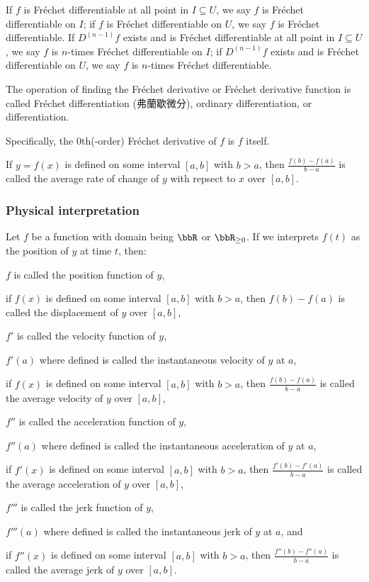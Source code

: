 If $f$ is Fréchet differentiable at all point in $I\subseteq U$, we say $f$ is Fréchet differentiable on $I$; if $f$ is Fréchet differentiable on $U$, we say $f$ is Fréchet differentiable. If $D^{(n-1)}f$ exists and is Fréchet differentiable at all point in $I\subseteq U$, we say $f$ is $n$-times Fréchet differentiable on $I$; if $D^{(n-1)}f$ exists and is Fréchet differentiable on $U$, we say $f$ is $n$-times Fréchet differentiable.

The operation of finding the Fréchet derivative or Fréchet derivative function is called Fréchet differentiation (弗蘭歇微分), ordinary differentiation, or differentiation.

Specifically, the $0$th(-order) Fréchet derivative of $f$ is $f$ itself.

If $y=f(x)$ is defined on some interval $[a,b]$ with $b>a$, then $\frac{f(b)-f(a)}{b-a}$ is called the average rate of change of $y$ with repsect to $x$ over $[a,b]$.
\subsubsection{Physical interpretation}
Let $f$ be a function with domain being $\bbR$ or $\bbR_{\geq 0}$. If we interprets $f(t)$ as the position of $y$ at time $t$, then:
\bit
\item $f$ is called the position function of $y$,
\item if $f(x)$ is defined on some interval $[a,b]$ with $b>a$, then $f(b)-f(a)$ is called the displacement of $y$ over $[a,b]$,
\item $f'$ is called the velocity function of $y$,
\item $f'(a)$ where defined is called the instantaneous velocity of $y$ at $a$,
\item if $f(x)$ is defined on some interval $[a,b]$ with $b>a$, then $\frac{f(b)-f(a)}{b-a}$ is called the average velocity of $y$ over $[a,b]$,
\item $f''$ is called the acceleration function of $y$,
\item $f''(a)$ where defined is called the instantaneous acceleration of $y$ at $a$,
\item if $f'(x)$ is defined on some interval $[a,b]$ with $b>a$, then $\frac{f'(b)-f'(a)}{b-a}$ is called the average acceleration of $y$ over $[a,b]$,
\item $f'''$ is called the jerk function of $y$,
\item $f'''(a)$ where defined is called the instantaneous jerk of $y$ at $a$, and
\item if $f''(x)$ is defined on some interval $[a,b]$ with $b>a$, then $\frac{f''(b)-f''(a)}{b-a}$ is called the average jerk of $y$ over $[a,b]$.
\eit
